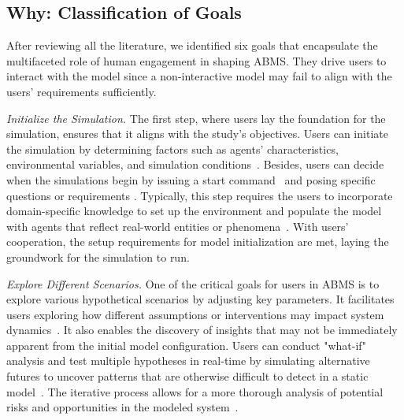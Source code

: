 \subsection{Why: Classification of Goals}\label{goal}
After reviewing all the literature, we identified six goals that encapsulate the multifaceted role of human engagement in shaping ABMS.
They drive users to interact with the model since a non-interactive model may fail to align with the users' requirements sufficiently.

\textit{Initialize the Simulation.}
The first step, where users lay the foundation for the simulation, ensures that it aligns with the study's objectives.
Users can initiate the simulation by determining factors such as agents' characteristics, environmental variables, and simulation conditions~\cite{10.1145/3586183.3606763, 10.1145/3526113.3545616}.
Besides, users can decide when the simulations begin by issuing a start command~\cite{chen2023agentversefacilitatingmultiagentcollaboration,chan2023chatevalbetterllmbasedevaluators} and posing specific questions or requirements \cite{ren2023robotsaskhelpuncertainty}.
Typically, this step requires the users to incorporate domain-specific knowledge to set up the environment and populate the model with agents that reflect real-world entities or phenomena~\cite{GAUBE201392}.
With users' cooperation, the setup requirements for model initialization are met, laying the groundwork for the simulation to run.

\textit{Explore Different Scenarios.}
One of the critical goals for users in ABMS is to explore various hypothetical scenarios by adjusting key parameters.
It facilitates users exploring how different assumptions or interventions may impact system dynamics~\cite{10.1145/3613904.3642159}.
It also enables the discovery of insights that may not be immediately apparent from the initial model configuration.
Users can conduct "what-if" analysis and test multiple hypotheses in real-time by simulating alternative futures to uncover patterns that are otherwise difficult to detect in a static model~\cite{10.1145/3526113.3545616}.
The iterative process allows for a more thorough analysis of potential risks and opportunities in the modeled system~\cite{hua2024warpeacewaragentlarge}.

